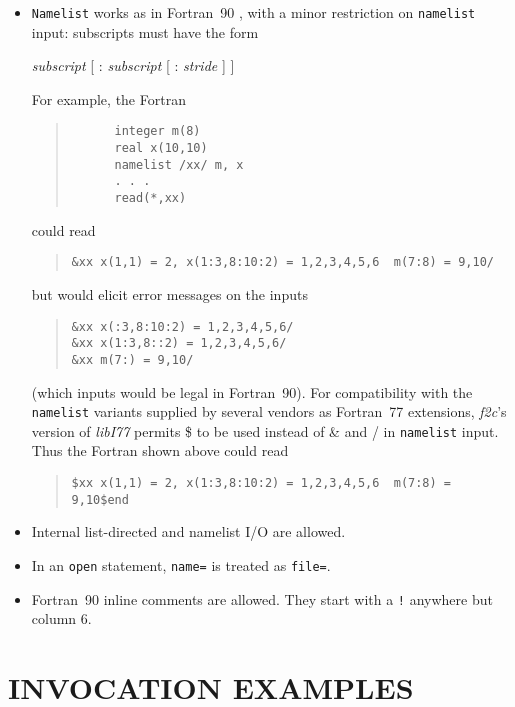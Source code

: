 \documentclass[10pt,a4paper]{article}
\begin{document}
\begin{itemize}
\item \verb|Namelist| works as in Fortran~90 \citep{2}, with a minor restriction on \verb|namelist| input: subscripts must
have the form
\begin{center}
\emph{subscript} [ : \emph{subscript} [ : \emph{stride} ] ]
\end{center}
For example, the Fortran
\begin{quote}
\begin{verbatim}
      integer m(8)
      real x(10,10)
      namelist /xx/ m, x
      . . .
      read(*,xx)
\end{verbatim}
\end{quote}
could read
\begin{quote}
\begin{verbatim}
&xx x(1,1) = 2, x(1:3,8:10:2) = 1,2,3,4,5,6  m(7:8) = 9,10/
\end{verbatim}
\end{quote}
but would elicit error messages on the inputs
\begin{quote}
\begin{verbatim}
&xx x(:3,8:10:2) = 1,2,3,4,5,6/
&xx x(1:3,8::2) = 1,2,3,4,5,6/
&xx m(7:) = 9,10/
\end{verbatim}
\end{quote}
(which inputs would be legal in Fortran~90). For compatibility with the \verb|namelist| variants supplied by several vendors as Fortran~77 extensions, \emph{f2c}’s version of \emph{libI77} permits \$ to be used instead of \& and / in \verb|namelist| input. Thus the Fortran shown above could read
\begin{quote}
\begin{verbatim}
$xx x(1,1) = 2, x(1:3,8:10:2) = 1,2,3,4,5,6  m(7:8) = 9,10$end
\end{verbatim}
\end{quote}

\item Internal list-directed and namelist I/O are allowed.

\item In an \verb|open| statement, \verb|name=| is treated as \verb|file=|.

\item Fortran~90 inline comments are allowed. They start with a \verb|!| anywhere but column 6.
\end{itemize}

\section{INVOCATION EXAMPLES} \label{sec:invocation-examples}
\end{document}
